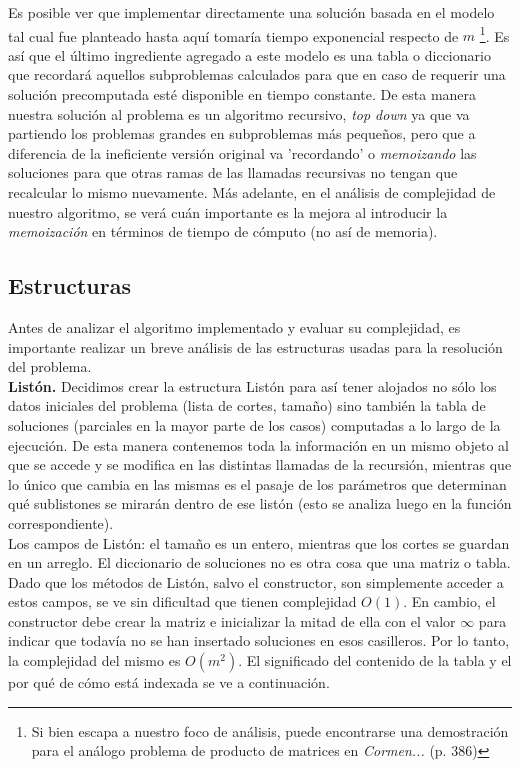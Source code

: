 \indent Es posible ver que implementar directamente una solución basada en el modelo tal cual fue planteado hasta aquí tomaría tiempo exponencial respecto de $m$ \footnote{Si bien escapa a nuestro foco de análisis, puede encontrarse una demostración para el análogo problema de producto de matrices en \textit{Cormen...} (p. 386)}. Es así que el último ingrediente agregado a este modelo es una tabla o diccionario que recordará aquellos subproblemas calculados para que en caso de requerir una solución precomputada esté disponible en tiempo constante. De esta manera nuestra solución al problema es un algoritmo recursivo, \textsl{top down} ya que va partiendo los problemas grandes en subproblemas más pequeños, pero que a diferencia de la ineficiente versión original va 'recordando' o \textsl{memoizando} las soluciones para que otras ramas de las llamadas recursivas no tengan que recalcular lo mismo nuevamente. Más adelante, en el análisis de complejidad de nuestro algoritmo, se verá cuán importante es la mejora al introducir la \textsl{memoización} en términos de tiempo de cómputo (no así de memoria).

\subsection{Estructuras}

Antes de analizar el algoritmo implementado y evaluar su complejidad, es importante realizar un breve análisis de las estructuras usadas para la resolución del problema.\\

\textbf{Listón.} Decidimos crear la estructura Listón para así tener alojados no sólo los datos iniciales del problema (lista de cortes, tamaño) sino también la tabla de soluciones (parciales en la mayor parte de los casos) computadas a lo largo de la ejecución. De esta manera contenemos toda la información en un mismo objeto al que se accede y se modifica en las distintas llamadas de la recursión, mientras que lo único que cambia en las mismas es el pasaje de los parámetros que determinan qué sublistones se mirarán dentro de ese listón (esto se analiza luego en la función correspondiente).\\
\indent Los campos de Listón: el tamaño es un entero, mientras que los cortes se guardan en un arreglo. El diccionario de soluciones no es otra cosa que una matriz o tabla. Dado que los métodos de Listón, salvo el constructor, son simplemente acceder a estos campos, se ve sin dificultad que tienen complejidad $O(1)$. En cambio, el constructor debe crear la matriz e inicializar la mitad de ella con el valor $\infty$ para indicar que todavía no se han insertado soluciones en esos casilleros. Por lo tanto, la complejidad del mismo es $O(m^2)$. El significado del contenido de la tabla y el por qué de cómo está indexada se ve a continuación.\\

